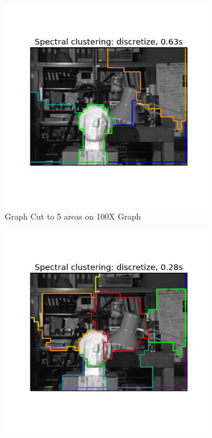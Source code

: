 \begin{figure}[h!]
        \begin{subfigure}[h]{0.33\textwidth}
                \includegraphics[width=\textwidth]{fig/592_small_5.png}
                \caption{Graph Cut to 5 areas on 100X Graph}
                \label{fig:graphcut_small_5}
        \end{subfigure}%
        \begin{subfigure}[h]{0.33\textwidth}
                \includegraphics[width=\textwidth]{fig/592_small_10.png}

\end{subfigure}
\end{figure}
